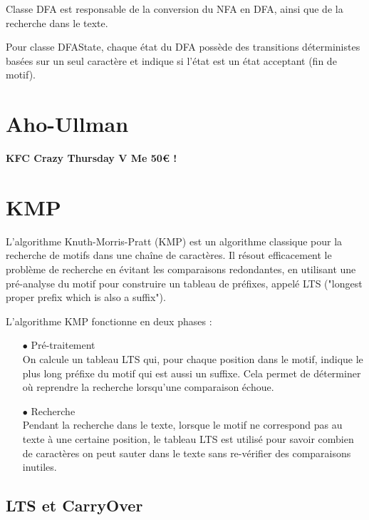 \documentclass[11pt,english]{article}
\begin{document}
Classe DFA est responsable de la conversion du NFA en DFA, ainsi que de la recherche dans le texte.

\indent Pour classe DFAState, chaque état du DFA possède des transitions déterministes basées sur un seul caractère et indique si l'état est un état acceptant (fin de motif).
\section{Aho-Ullman}

\indent

\textbf{KFC Crazy Thursday V Me 50€ !}

\section{KMP}

\indent

L'algorithme Knuth-Morris-Pratt (KMP) est un algorithme classique pour la recherche de motifs dans une chaîne de caractères. Il résout efficacement le problème de recherche en évitant les comparaisons redondantes, en utilisant une pré-analyse du motif pour construire un tableau de préfixes, appelé LTS ("longest proper prefix which is also a suffix").

\indent L'algorithme KMP fonctionne en deux phases :

\begin{itemize}
    \item [$\bullet$] Pré-traitement
    \\
    On calcule un tableau LTS qui, pour chaque position dans le motif, indique le plus long préfixe du motif qui est aussi un suffixe. Cela permet de déterminer où reprendre la recherche lorsqu'une comparaison échoue.
    
    \item [$\bullet$] Recherche
    \\
    Pendant la recherche dans le texte, lorsque le motif ne correspond pas au texte à une certaine position, le tableau LTS est utilisé pour savoir combien de caractères on peut sauter dans le texte sans re-vérifier des comparaisons inutiles.
\end{itemize}

\subsection{LTS et CarryOver}

\indent 
\end{document}
